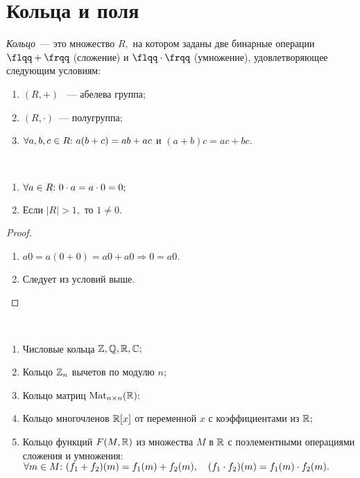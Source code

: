 \newpage
	\section{Кольца и поля}
	\setcounter{definition}{0}
	\begin{definition}
		\textit{Кольцо}~--- это множество $R,$ на котором заданы две бинарные операции ${\flqq+\frqq}$ (сложение) и ${\flqq \cdot \frqq}$ (умножение), удовлетворяющее следующим условиям:
		\begin{enumerate}
			\setlength\itemsep{0.1em}
			\item $(R, +)$ ~--- абелева группа;
			\item $(R, \cdot)$~--- полугруппа;
			\item $\forall a, b, c \in R{:}{ } \  a(b + c) = ab + ac$ и $(a + b)c = ac + bc.$
		\end{enumerate} 
	\end{definition}
	\begin{remark}
		\
		\begin{enumerate}
			\setlength\itemsep{0.1em}
			\item $\forall a \in R{:}{ } \  0 \cdot a = a \cdot 0 = 0;$
			\item Если $|R| > 1,$ то $1 \neq 0.$ 
		\end{enumerate}
	\end{remark}
	\begin{proof}
		\
		\begin{enumerate}
			\setlength\itemsep{0.1em}
			\item $a0 = a(0 + 0) = a0 + a0 \Rightarrow 0 = a0.$
			\item Следует из условий выше. \qedhere
		\end{enumerate}
	\end{proof}
	\begin{exmpls}
		\
		\begin{enumerate}
			\setlength\itemsep{0.1em}
			\item Числовые кольца $\mathbb{Z}, \mathbb{Q}, \mathbb{R}, \mathbb{C};$
			\item Кольцо $\mathbb{Z}_n$ вычетов по модулю $n;$
			\item Кольцо матриц $\mathrm{Mat}_{n \times n}(\mathbb{R});$
			\item Кольцо многочленов $\mathbb{R}[x]$ от переменной $x$ с коэффициентами из $\mathbb{R};$
			\item Кольцо функций $F(M, \mathbb{R})$ из множества $M$ в $\mathbb{R}$ с поэлементными
			операциями сложения и умножения: \n
			$\forall m \in M{:}{ } \  (f_1 + f_2)(m) = f_1(m) + f_2(m), \quad (f_1 \cdot f_2)(m) = f_1(m) \cdot f_2(m).$
		\end{enumerate}
	\end{exmpls}
